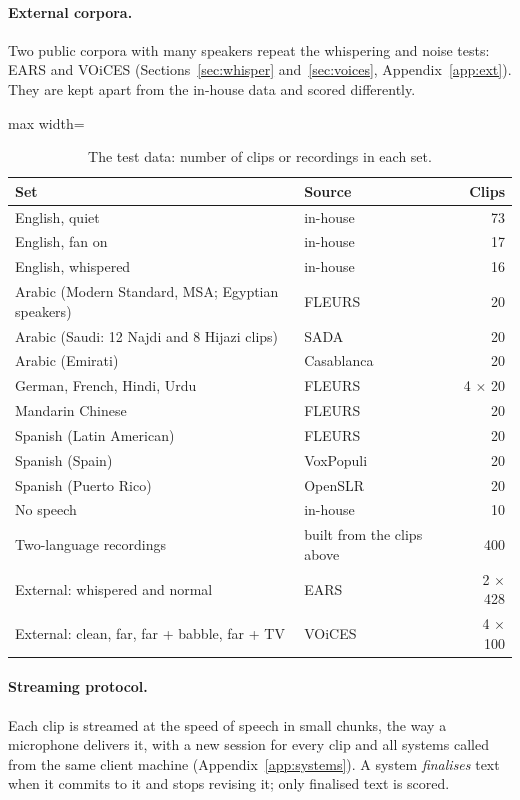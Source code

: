 \documentclass[11pt]{article}
\begin{document}
\paragraph{External corpora.} Two public corpora with many speakers repeat the whispering and noise tests: EARS and VOiCES (Sections~\ref{sec:whisper} and~\ref{sec:voices}, Appendix~\ref{app:ext}). They are kept apart from the in-house data and scored differently.

\begin{table}[!htbp]
\centering\small
\begin{adjustbox}{max width=\textwidth}
\begin{tabular}{@{}llr@{}}
\toprule
Set & Source & Clips \\
\midrule
English, quiet & in-house & 73 \\
English, fan on & in-house & 17 \\
English, whispered & in-house & 16 \\
\midrule
Arabic (Modern Standard, MSA; Egyptian speakers) & FLEURS \citep{conneau2023fleurs} & 20 \\
Arabic (Saudi: 12 Najdi and 8 Hijazi clips) & SADA \citep{alharbi2024sada} & 20 \\
Arabic (Emirati) & Casablanca \citep{talafha2024casablanca} & 20 \\
German, French, Hindi, Urdu & FLEURS & 4 $\times$ 20 \\
Mandarin Chinese & FLEURS & 20 \\
Spanish (Latin American) & FLEURS & 20 \\
Spanish (Spain) & VoxPopuli \citep{wang2021voxpopuli} & 20 \\
Spanish (Puerto Rico) & OpenSLR \citep{guevara2020crowdsourcing} & 20 \\
\midrule
No speech & in-house & 10 \\
Two-language recordings & built from the clips above & 400 \\
\midrule
External: whispered and normal & EARS \citep{richter2024ears} & 2 $\times$ 428 \\
External: clean, far, far + babble, far + TV & VOiCES \citep{richey2018voices} & 4 $\times$ 100 \\
\bottomrule
\end{tabular}
\end{adjustbox}
\caption{The test data: number of clips or recordings in each set.}
\label{tab:data}
\end{table}

\paragraph{Streaming protocol.} Each clip is streamed at the speed of speech in small chunks, the way a microphone delivers it, with a new session for every clip and all systems called from the same client machine (Appendix~\ref{app:systems}). A system \emph{finalises} text when it commits to it and stops revising it; only finalised text is scored.
\end{document}

